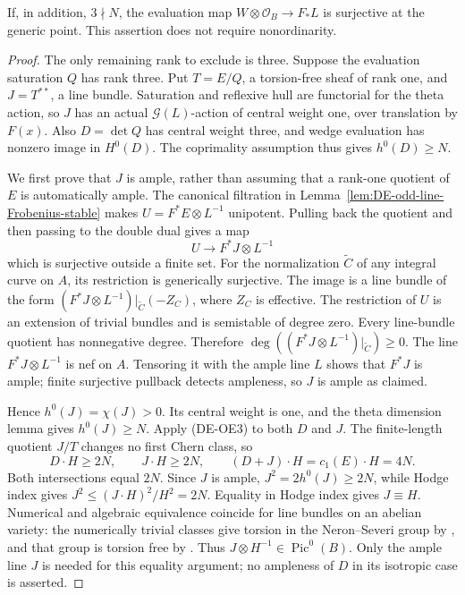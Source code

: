 \begin{proposition}
\label{prop:DE-prime-to-six-evaluation-four}
If, in addition, \(3\nmid N\), the evaluation map
\(W\otimes\mathcal O_B\to F_*L\) is surjective at the
generic point. This assertion does not require nonordinarity.
\end{proposition}
\begin{proof}
The only remaining rank to exclude is three. Suppose the
evaluation saturation \(Q\) has rank three. Put
\(T=E/Q\), a torsion-free sheaf of rank one, and
\(J=T^{**}\), a line bundle. Saturation and reflexive hull
are functorial for the theta action, so \(J\) has an actual
\(\mathcal G(L)\)-action of central weight one, over translation
by \(F(x)\). Also \(D=\det Q\) has central weight three,
and wedge evaluation has nonzero image in \(H^0(D)\).
The coprimality assumption thus gives \(h^0(D)\ge N\).

We first prove that \(J\) is ample, rather than assuming
that a rank-one quotient of \(E\) is automatically ample.
The canonical filtration in
Lemma~\ref{lem:DE-odd-line-Frobenius-stable} makes
\(U=F^*E\otimes L^{-1}\) unipotent. Pulling back the quotient
and then passing to the double dual gives a map
\[
                   U\longrightarrow F^*J\otimes L^{-1}
 \tag{DE-OE7}
\]
which is surjective outside a finite set. For the normalization
\(\widetilde C\) of any integral curve on \(A\), its restriction
is generically surjective. The image is a line bundle of the form
\((F^*J\otimes L^{-1})|_{\widetilde C}(-Z_C)\),
where \(Z_C\) is effective. The restriction of \(U\) is an
extension of trivial bundles and is semistable of degree zero.
Every line-bundle quotient has nonnegative degree. Therefore
\(\deg((F^*J\otimes L^{-1})|_{\widetilde C})\ge0\).
The line \(F^*J\otimes L^{-1}\) is nef on \(A\).
Tensoring it with the ample line \(L\) shows that \(F^*J\)
is ample; finite surjective pullback detects ampleness, so \(J\)
is ample as claimed.

Hence \(h^0(J)=\chi(J)>0\). Its central weight is one, and
the theta dimension lemma gives \(h^0(J)\ge N\).
Apply (DE-OE3) to both \(D\) and \(J\). The finite-length
quotient \(J/T\) changes no first Chern class, so
\[
  D\cdot H\ge2N,\qquad J\cdot H\ge2N,\qquad
  (D+J)\cdot H=c_1(E)\cdot H=4N.
 \tag{DE-OE8}
\]
Both intersections equal \(2N\). Since \(J\) is ample,
\(J^2=2h^0(J)\ge2N\), while Hodge index gives
\(J^2\le(J\cdot H)^2/H^2=2N\). Equality in Hodge index
gives \(J\equiv H\). Numerical and algebraic equivalence
coincide for line bundles on an abelian variety: the numerically
trivial classes give torsion in the Neron--Severi group by
\citep[Theorem~6.3, with Lemmas~6.5--6.6, pp.~52--56]
{KleimanPicardScheme}, and that group is torsion free by
\citep[Corollaries~7.23 and~7.25, pp.~106--107]
{EdixhovenVanDerGeerMoonenAV}. Thus
\(J\otimes H^{-1}\in\operatorname{Pic}^0(B)\).
Only the ample line \(J\) is needed for this equality argument;
no ampleness of \(D\) in its isotropic case is asserted.


\end{proof}
